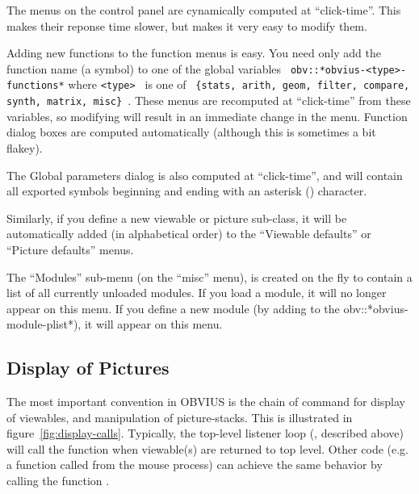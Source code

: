 
The menus on the control panel are cynamically computed at
``click-time''.  This makes their reponse time slower, but makes it
very easy to modify them.  

Adding new functions to the function menus is easy.  You need only add
the function name (a symbol) to one of the global variables {\tt
obv::*obvius-<type>-functions*} where {\tt <type> } is one of {\tt
\{stats, arith, geom, filter, compare, synth, matrix, misc\} }.  These
menus are recomputed at ``click-time'' from these variables, so
modifying will result in an immediate change in the menu.  Function
dialog boxes are computed automatically (although this is sometimes a
bit flakey).

The Global parameters dialog is also computed at ``click-time'', and
will contain all exported symbols beginning and ending with an
asterisk (\*) character.

Similarly, if you define a new viewable or picture sub-class, it will
be automatically added (in alphabetical order) to the ``Viewable
defaults'' or ``Picture defaults'' menus.

The ``Modules'' sub-menu (on the ``misc'' menu), is created on the fly
to contain a list of all currently unloaded modules.  If you load a
module, it will no longer appear on this menu.  If you define a new
module (by adding to the obv::*obvius-module-plist*), it will appear
on this menu.

\subsection{Display of Pictures}
\label{sec:auto-display}



The most important convention in OBVIUS is the chain of command for
display of viewables, and manipulation of picture-stacks.  This is
illustrated in figure~\ref{fig:display-calls}.  Typically, the
top-level listener loop (, described above) will call the
 function when viewable(s) are returned
to top level.  Other code (e.g. a function called from the mouse
process) can achieve the same behavior by calling the function
.

